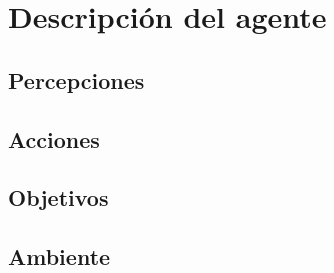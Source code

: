 \section{Descripción del agente}

\subsection{Percepciones}

\subsection{Acciones}

\subsection{Objetivos}

\subsection{Ambiente}
